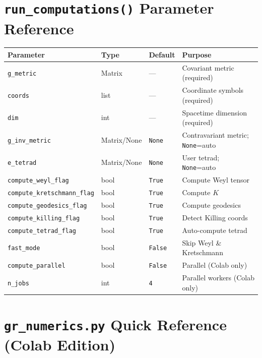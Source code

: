 \documentclass[11pt,a4paper]{article}
\newcommand{\code}[1]{\texttt{\small#1}}
\begin{document}
\section{\code{run\_computations()} Parameter Reference}
\label{app:runcomp}

\begin{center}
\begin{longtable}{p{4cm}p{2cm}p{1.5cm}p{6.5cm}}
  \toprule
  Parameter & Type & Default & Purpose \\
  \midrule\endhead
  \code{g\_metric} & Matrix & — & Covariant metric (required) \\
  \code{coords} & list & — & Coordinate symbols (required) \\
  \code{dim} & int & — & Spacetime dimension (required) \\
  \code{g\_inv\_metric} & Matrix/None & \code{None} & Contravariant metric; \code{None}=auto \\
  \code{e\_tetrad} & Matrix/None & \code{None} & User tetrad; \code{None}=auto \\
  \code{compute\_weyl\_flag} & bool & \code{True} & Compute Weyl tensor \\
  \code{compute\_kretschmann\_flag} & bool & \code{True} & Compute $K$ \\
  \code{compute\_geodesics\_flag} & bool & \code{True} & Compute geodesics \\
  \code{compute\_killing\_flag} & bool & \code{True} & Detect Killing coords \\
  \code{compute\_tetrad\_flag} & bool & \code{True} & Auto-compute tetrad \\
  \code{fast\_mode} & bool & \code{False} & Skip Weyl \& Kretschmann \\
  \code{compute\_parallel} & bool & \code{False} & Parallel (Colab only) \\
  \code{n\_jobs} & int & \code{4} & Parallel workers (Colab only) \\
  \bottomrule
\end{longtable}
\end{center}

\section{\code{gr\_numerics.py} Quick Reference (Colab Edition)}
\label{app:numerics}
\end{document}
